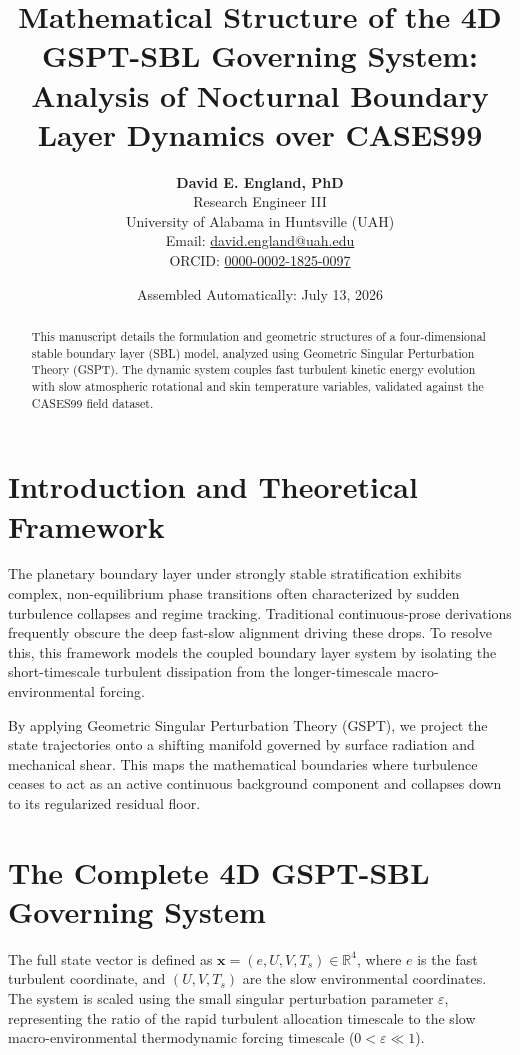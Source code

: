 \documentclass{article}
\title{Mathematical Structure of the 4D GSPT-SBL Governing System:\\
Analysis of Nocturnal Boundary Layer Dynamics over CASES99}
\author{
    \textbf{David E. England, PhD} \\
    Research Engineer III \\
    University of Alabama in Huntsville (UAH) \\
    Email: \href{mailto:david.england@uah.edu}{david.england@uah.edu} \\
    ORCID: \href{https://orcid.org/0000-0002-1825-0097}{0000-0002-1825-0097}
}
\date{\small Assembled Automatically: July 13, 2026}
\begin{document}
\maketitle

\begin{abstract}
This manuscript details the formulation and geometric structures of a four-dimensional stable boundary layer (SBL) model, analyzed using Geometric Singular Perturbation Theory (GSPT). The dynamic system couples fast turbulent kinetic energy evolution with slow atmospheric rotational and skin temperature variables, validated against the CASES99 field dataset.
\end{abstract}

\section{Introduction and Theoretical Framework}
\label{sec:theory}

The planetary boundary layer under strongly stable stratification exhibits complex, non-equilibrium phase transitions often characterized by sudden turbulence collapses and regime tracking. Traditional continuous-prose derivations frequently obscure the deep fast-slow alignment driving these drops. To resolve this, this framework models the coupled boundary layer system by isolating the short-timescale turbulent dissipation from the longer-timescale macro-environmental forcing.

By applying Geometric Singular Perturbation Theory (GSPT), we project the state trajectories onto a shifting manifold governed by surface radiation and mechanical shear. This maps the mathematical boundaries where turbulence ceases to act as an active continuous background component and collapses down to its regularized residual floor.

\section{The Complete 4D GSPT-SBL Governing System}
\label{sec:governing_system}

The full state vector is defined as $\mathbf{x} = (e, U, V, T_s) \in \mathbb{R}^4$, where $e$ is the fast turbulent coordinate, and $(U, V, T_s)$ are the slow environmental coordinates. The system is scaled using the small singular perturbation parameter $\varepsilon$, representing the ratio of the rapid turbulent allocation timescale to the slow macro-environmental thermodynamic forcing timescale ($0 < \varepsilon \ll 1$).
\end{document}
